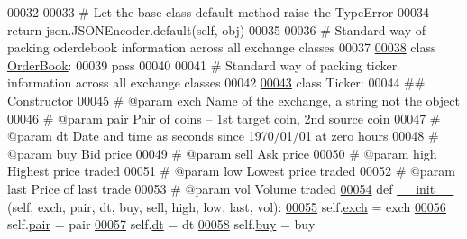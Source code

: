 \begin{DoxyCode}
00032             
00033         \textcolor{comment}{# Let the base class default method raise the TypeError}
00034         \textcolor{keywordflow}{return} json.JSONEncoder.default(self, obj)
00035 
00036 \textcolor{comment}{# Standard way of packing oderdebook information across all exchange classes}
00037         
\hypertarget{exchange_8py_source.tex_l00038}{}\hyperlink{classexchange_1_1_order_book}{00038} \textcolor{keyword}{class }\hyperlink{classexchange_1_1_order_book}{OrderBook}:
00039     \textcolor{keywordflow}{pass}
00040 
00041 \textcolor{comment}{# Standard way of packing ticker information across all exchange classes}
00042         
\hypertarget{exchange_8py_source.tex_l00043}{}\hyperlink{classexchange_1_1_ticker}{00043} \textcolor{keyword}{class }Ticker:
00044     \textcolor{comment}{## Constructor}
00045     \textcolor{comment}{# @param exch Name of the exchange, a string not the object }
00046     \textcolor{comment}{# @param pair Pair of coins -- 1st target coin, 2nd source coin }
00047     \textcolor{comment}{# @param dt Date and time as seconds since 1970/01/01 at zero hours}
00048     \textcolor{comment}{# @param buy Bid price}
00049     \textcolor{comment}{# @param sell Ask price}
00050     \textcolor{comment}{# @param high Highest price traded}
00051     \textcolor{comment}{# @param low Lowest price traded}
00052     \textcolor{comment}{# @param last Price of last trade}
00053     \textcolor{comment}{# @param vol Volume traded}
\hypertarget{exchange_8py_source.tex_l00054}{}\hyperlink{classexchange_1_1_ticker_a4a8c99ada461a4aeb960c14020a47736}{00054}     \textcolor{keyword}{def }\hyperlink{classexchange_1_1_ticker_a4a8c99ada461a4aeb960c14020a47736}{\_\_init\_\_} (self, exch, pair, dt, buy, sell, high, low, last, vol):
\hypertarget{exchange_8py_source.tex_l00055}{}\hyperlink{classexchange_1_1_ticker_a33f33fe9a12da3ce52938afdc577c061}{00055}         self.\hyperlink{classexchange_1_1_ticker_a33f33fe9a12da3ce52938afdc577c061}{exch} = exch
\hypertarget{exchange_8py_source.tex_l00056}{}\hyperlink{classexchange_1_1_ticker_a382f9199d13a7b5929a26065fad4e491}{00056}         self.\hyperlink{classexchange_1_1_ticker_a382f9199d13a7b5929a26065fad4e491}{pair} = pair
\hypertarget{exchange_8py_source.tex_l00057}{}\hyperlink{classexchange_1_1_ticker_a45e3162d9956cee797f21d93c44c6baf}{00057}         self.\hyperlink{classexchange_1_1_ticker_a45e3162d9956cee797f21d93c44c6baf}{dt}   = dt
\hypertarget{exchange_8py_source.tex_l00058}{}\hyperlink{classexchange_1_1_ticker_a2ca48c3fa9aba92241392a05bef39324}{00058}         self.\hyperlink{classexchange_1_1_ticker_a2ca48c3fa9aba92241392a05bef39324}{buy}  = buy 

\end{DoxyCode}
